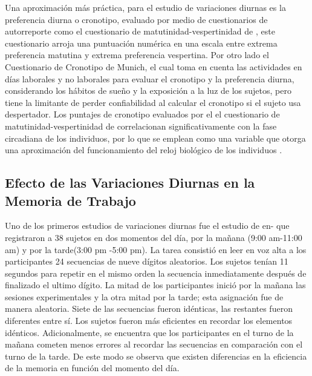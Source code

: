 \documentclass[12pt,letterpaper,final]{article}
\let\cite\cite %
\begin{document}
Una aproximación más práctica, para el estudio de variaciones diurnas es la preferencia diurna o cronotipo,  evaluado por medio de cuestionarios de autorreporte como el cuestionario de matutinidad-vespertinidad de , este cuestionario arroja una puntuación numérica en una escala entre extrema preferencia matutina y extrema preferencia vespertina. Por otro lado el Cuestionario de Cronotipo de Munich, el cual toma en cuenta las actividades en días laborales y no laborales para evaluar el cronotipo y la preferencia diurna, considerando los hábitos de sueño y la exposición a la luz de los sujetos, pero tiene la limitante de perder confiabilidad al calcular el cronotipo si el sujeto usa despertador. Los puntajes de cronotipo evaluados por el   el cuestionario de matutinidad-vespertinidad de  correlacionan significativamente con la fase circadiana de los individuos, por lo que se emplean como una variable que otorga una aproximación del funcionamiento del reloj biológico de los individuos \cite{Duffy,VonSchantz2015}.

\subsection{Efecto de las Variaciones Diurnas en la Memoria de Trabajo}

Uno de los primeros estudios de variaciones diurnas fue el estudio de   en- que registraron a 38 sujetos en dos momentos del día, por la mañana (9:00 am-11:00 am)  y por la tarde(3:00 pm -5:00 pm). La tarea consistió en leer en voz alta a los participantes 24 secuencias de nueve dígitos aleatorios. Los sujetos tenían 11 segundos para repetir en el mismo orden la secuencia inmediatamente después de finalizado el ultimo dígito. La mitad de los participantes inició por la mañana las sesiones experimentales y la otra mitad por la tarde; esta asignación fue de manera aleatoria. Siete de las secuencias fueron idénticas, las restantes fueron diferentes entre sí. Los sujetos fueron más eficientes en recordar los elementos idénticos.
Adicionalmente, se encuentra que los participantes en el turno de la mañana cometen menos errores al recordar las secuencias en comparación con el turno de la tarde.
De este modo se observa que existen diferencias en la eficiencia de la memoria en función del momento del día.
\end{document}

